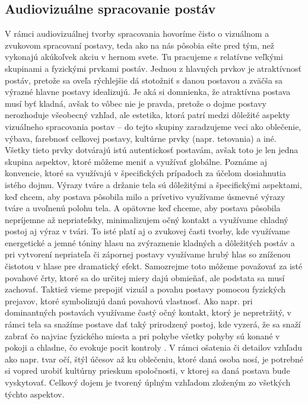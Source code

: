 \documentclass[10pt,twoside,slovak,a4paper]{article}
\begin{document}
\subsection{Audiovizuálne spracovanie postáv}\label{3.0:3.1}
V rámci audiovizuálnej tvorby spracovania hovoríme čisto o vizuálnom a zvukovom spracovaní postavy, teda ako na nás pôsobia ešte pred tým, než vykonajú akúkoľvek akciu v hernom svete. Tu pracujeme s relatívne veľkými skupinami a fyzickými prvkami postáv. Jednou z hlavných prvkov je atraktívnosť postáv, pretože sa oveľa rýchlejšie dá stotožniť s danou postavou a zväčša sa výrazné hlavne postavy idealizujú. Je aká si domnienka, že atraktívna postava musí byť kladná, avšak to vôbec nie je pravda, pretože o dojme postavy nerozhoduje všeobecný vzhľad, ale estetika, ktorá patrí medzi dôležité aspekty vizuálneho spracovania postav – do tejto skupiny zaradzujeme veci ako oblečenie, výbava, farebnosť celkovej postavy, kultúrne prvky (napr. tetovania) a iné. Všetky tieto prvky dotvárajú istú autentickosť postavám, avšak toto je len jedna skupina aspektov, ktoré môžeme meniť a využívať globálne. Poznáme aj konvencie, ktoré sa využívajú v špecifických prípadoch za účelom dosiahnutia istého dojmu. Výrazy tváre a držanie tela sú dôležitými a špecifickými aspektami, keď chcem, aby postava pôsobila milo a prívetivo využívame úsmevné výrazy tváre a uvoľnenú polohu tela. A opätovne keď chceme, aby postava pôsobila nepríjemne až nepriateľsky, minimalizujem očný kontakt a využívame chladný postoj aj výraz v tvári. To isté platí aj o zvukovej časti tvorby, kde využívame energetické a jemné tóniny hlasu na zvýraznenie kladných a dôležitých postáv a pri vytvorení nepriateľa či zápornej postavy využívame hrubý hlas so zníženou čistotou v hlase pre dramatický efekt. Samozrejme toto môžeme považovať za isté povahové črty, ktoré sa do určitej miery dajú obmieňať, ale podstata sa musí zachovať.
Taktiež vieme prepojiť vizuál a povahu postavy pomocou fyzických prejavov, ktoré symbolizujú danú povahovú vlastnosť. Ako napr. pri dominantných postavách využívame častý očný kontakt, ktorý je nepretržitý, v rámci tela sa snažíme postave dať taký prirodzený postoj, kde vyzerá, že sa snaží zabrať čo najviac fyzického miesta a pri pohybe všetky pohyby sú konané v pokoji a chladne, čo evokuje pocit kontroly . 
V rámci ošatenia či detailov vzhľadu ako napr. tvar očí, štýl účesov až ku oblečeniu, ktoré daná osoba nosí, je potrebné si vopred urobiť kultúrny prieskum spoločnosti, v ktorej sa daná postava bude vyskytovať. Celkový dojem je tvorený úplným vzhľadom zloženým zo všetkých týchto aspektov.
\end{document}

